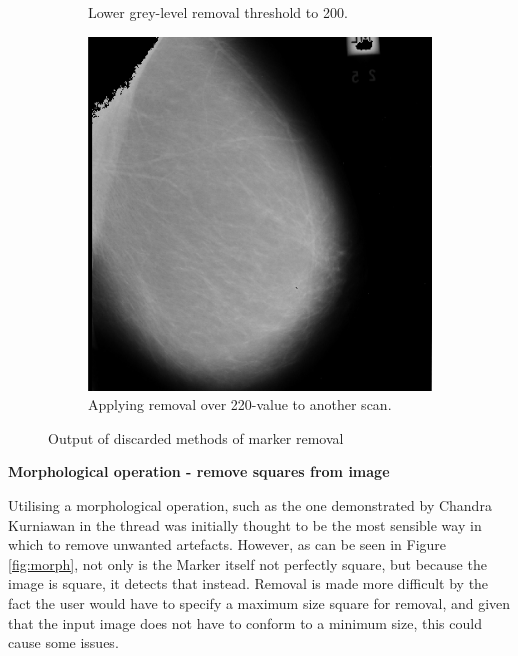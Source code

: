 \begin{figure}[H]
\begin{subfigure}[t]{0.3\textwidth}
      \caption{Lower grey-level removal threshold to 200.}
      \label{fig:remove-white-200}
    \end{subfigure} \hfill
    \begin{subfigure}[t]{0.3\textwidth}
      \includegraphics[width=\textwidth]{Chapter2/technical-img/other-scan.png}
      \caption{Applying removal over 220-value to another scan.}
      \label{fig:remove-other-scan}
    \end{subfigure}
    \caption{Output of discarded methods of marker removal}
    \label{fig:marker-removal-discards}
\end{figure}

\noindent \textbf{Morphological operation - remove squares from image}

Utilising a morphological operation, such as the one demonstrated by Chandra Kurniawan in the thread \cite{detect_square} was initially thought to be the most sensible way in which to remove unwanted artefacts. However, as can be seen in Figure \ref{fig:morph}, not only is the Marker itself not perfectly square, but because the image is square, it detects that instead. Removal is made more difficult by the fact the user would have to specify a maximum size square for removal, and given that the input image does not have to conform to a minimum size, this could cause some issues.

